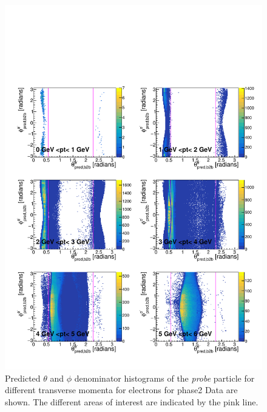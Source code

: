 \documentclass[a4paper,11pt,twosided,final,german,openbib,pdftex,listof=totoc,bibliography=totoc]{scrbook}
\begin{document}
\begin{appendix}
\begin{figure}[h!]
	\includegraphics[width=\textwidth]{Plots/master/RTPtMemD_Data.pdf}
	\caption[Denominator $\theta$-$\phi$ Electron Transverse Momentum Phase2 Data]{Predicted $\theta$ and $\phi$ denominator histograms of the \textit{probe} particle for different transverse momenta for electrons for phase2 Data are shown. The different areas of interest are indicated by the pink line.}
	\label{plt:RTPtMemD_Data}
\end{figure}


\end{appendix}
\end{document}
